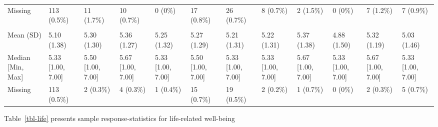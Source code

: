 \documentclass[
  single column]{article}
\begin{document}
\begin{landscape}
\begin{longtable}[t]{llllllllllll}
\hspace{1em}Missing & 113 (0.5\%) & 11 (1.7\%) & 10 (0.7\%) & 0 (0\%) & 17 (0.8\%) & 26 (0.7\%) & 8 (0.7\%) & 2 (1.5\%) & 0 (0\%) & 7 (1.2\%) & 7 (0.9\%)\\
\addlinespace[0.3em]
\multicolumn{12}{l}{\textbf{Self Esteem}}\\
\hspace{1em}Mean (SD) & 5.10 (1.38) & 5.30 (1.30) & 5.36 (1.27) & 5.25 (1.32) & 5.27 (1.29) & 5.21 (1.31) & 5.22 (1.31) & 5.37 (1.38) & 4.88 (1.50) & 5.32 (1.19) & 5.03 (1.46)\\
\hspace{1em}Median [Min, Max] & 5.33 [1.00, 7.00] & 5.50 [1.00, 7.00] & 5.67 [1.00, 7.00] & 5.33 [1.00, 7.00] & 5.50 [1.00, 7.00] & 5.33 [1.00, 7.00] & 5.33 [1.00, 7.00] & 5.67 [1.00, 7.00] & 5.33 [1.00, 7.00] & 5.67 [1.00, 7.00] & 5.33 [1.00, 7.00]\\
\hspace{1em}Missing & 113 (0.5\%) & 2 (0.3\%) & 4 (0.3\%) & 1 (0.4\%) & 15 (0.7\%) & 19 (0.5\%) & 2 (0.2\%) & 1 (0.7\%) & 0 (0\%) & 2 (0.3\%) & 5 (0.7\%)\\*

\end{longtable}

\endgroup{}


\end{landscape}

\newpage{}

Table~\ref{tbl-life} presents sample response-statistics for
life-related well-being
\end{document}
